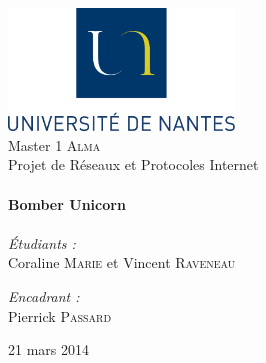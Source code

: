 
\begin{titlepage}
	\begin{center}

		\includegraphics[width=0.45\textwidth]{Figures/logoUN.png}~\\[2cm]

		\LARGE{Master 1 \textsc{Alma}}\\[1.5cm]

		\Large{Projet de Réseaux et Protocoles Internet}\\[0.5cm]

		\HRule \\[0.4cm]
		{ \huge \bfseries Bomber Unicorn \\[0.4cm] }
		\HRule \\[1.5cm]

		\normalsize		
		\emph{\'Etudiants :}\\
		Coraline \textsc{Marie} et Vincent \textsc{Raveneau}

		\vspace{0.5cm}

		\emph{Encadrant :} \\
		Pierrick \textsc{Passard}
		
		\vfill

		{\large 21 mars 2014}

	\end{center}
\end{titlepage}